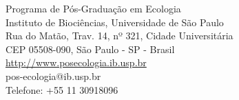 \documentclass[twoside, a4paper, 12pt]{report}
\begin{document}
\vspace*{\fill} 
\begin{flushright}
  \begin{spacing}{1.1}
    {\large Programa de Pós-Graduação em Ecologia\\
      Instituto de Biociências, Universidade de São Paulo\\
      Rua do Matão, Trav. 14, nº 321, Cidade Universitária\\
      CEP 05508-090, São Paulo - SP - Brasil\\[1.5em]
      \url{http://www.posecologia.ib.usp.br}\\
      pos-ecologia@ib.usp.br \\ 
      Telefone: +55 11 30918096\\
    }
  \end{spacing}  
\end{flushright}
\end{document}

